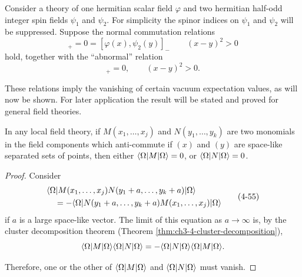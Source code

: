 Consider a theory of one hermitian scalar field $\varphi$ and two hermitian
half-odd integer spin fields $\psi_1$ and $\psi_2$.  For simplicity the spinor
indices on $\psi_1$ and $\psi_2$ will be suppressed.  Suppose the normal
commutation relations
\begin{equation}
  [\psi_1(x),\psi_2(y)]_+=0=[\varphi(x),\psi_2(y)]_-
  \qquad (x-y)^2>0
  \tag{4-53}\label{eq:ch4-53-example-2-normal}
\end{equation}
hold, together with the “abnormal” relation
\begin{equation}
  [\varphi(x),\psi_1(y)]_+=0,
  \qquad (x-y)^2>0.
  \tag{4-54}\label{eq:ch4-54-example-2-abnormal}
\end{equation}

These relations imply the vanishing of certain vacuum expectation values, as
will now be shown.  For later application the result will be stated and proved
for general field theories.

\begin{theorem}[4-11]\label{thm:ch4-11}

In any local field theory, if $M(x_1,\ldots,x_j)$ and $N(y_1,\ldots,y_k)$ are
two monomials in the field components which anti-commute if $(x)$ and
$(y)$ are space-like separated sets of points, then either
$\langle \Omega\rvert M\lvert \Omega\rangle=0$, or $\langle \Omega\rvert N\lvert \Omega\rangle=0$.
\end{theorem}

\begin{proof}

Consider
\begin{equation}
\begin{aligned}
  &\langle \Omega\rvert M(x_1,\ldots,x_j)N(y_1+a,\ldots,y_k+a)\lvert \Omega\rangle\\
  &\quad=-\langle \Omega\rvert N(y_1+a,\ldots,y_k+a)M(x_1,\ldots,x_j)\lvert \Omega\rangle
\end{aligned}
  \tag{4-55}\label{eq:ch4-55-theorem-4-11-cluster}
\end{equation}
if $a$ is a large space-like vector.  The limit of this equation as
$a\to\infty$ is, by the cluster decomposition theorem (Theorem \ref{thm:ch3-4-cluster-decomposition}),
\begin{equation*}
  \langle \Omega\rvert M\lvert \Omega\rangle\langle \Omega\rvert N\lvert \Omega\rangle
  =-\langle \Omega\rvert N\lvert \Omega\rangle\langle \Omega\rvert M\lvert \Omega\rangle.
\end{equation*}

Therefore, one or the other of $\langle \Omega\rvert M\lvert \Omega\rangle$ and
$\langle \Omega\rvert N\lvert \Omega\rangle$ must vanish.
\end{proof}

